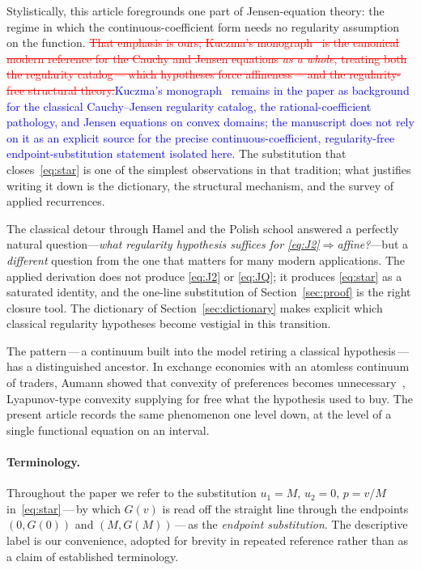 \documentclass{article}
\newcommand{\ReviewAdd}[1]{\textcolor{blue}{#1}}
\newcommand{\ReviewDel}[1]{\textcolor{red}{\sout{#1}}}
\theoremstyle{plain}
\theoremstyle{definition}
\begin{document}
Stylistically, this article foregrounds one part of Jensen-equation
theory: the regime in which the continuous-coefficient form needs no
regularity assumption on the function. \ReviewDel{That emphasis is ours; Kuczma's
monograph~\cite{Kuczma2009} is the canonical modern reference for the
Cauchy and Jensen equations \emph{as a whole}, treating both the
regularity catalog\,---\,which hypotheses force affineness\,---\,and the
regularity-free structural theory.}\ReviewAdd{Kuczma's monograph~\cite{Kuczma2009} remains in the paper as background for the classical Cauchy--Jensen regularity catalog, the rational-coefficient pathology, and Jensen equations on convex domains; the manuscript does not rely on it as an explicit source for the precise continuous-coefficient, regularity-free endpoint-substitution statement isolated here.}
The substitution that closes~\eqref{eq:star} is one of the simplest
observations in that tradition; what justifies writing it down is the
dictionary, the structural mechanism, and the survey of applied
recurrences.

The classical detour through Hamel and the Polish school answered a
perfectly natural question---\emph{what regularity hypothesis suffices
for \eqref{eq:J2}$\Rightarrow$affine?}---but a \emph{different}
question from the one that matters for many modern applications. The
applied derivation does not produce \eqref{eq:J2} or \eqref{eq:JQ};
it produces \eqref{eq:star} as a saturated identity, and the one-line
substitution of Section~\ref{sec:proof} is the right closure tool. The
dictionary of Section~\ref{sec:dictionary} makes explicit which classical
regularity hypotheses become vestigial in this transition.

The pattern\,---\,a continuum built into the model retiring a
classical hypothesis\,---\,has a distinguished ancestor. In exchange
economies with an atomless continuum of traders, Aumann showed that
convexity of preferences becomes unnecessary~\cite{Aumann1964},
Lyapunov-type convexity supplying for free what the hypothesis used to
buy. The present article records the same phenomenon one level down, at
the level of a single functional equation on an interval.

\paragraph{Terminology.}
Throughout the paper we refer to the substitution $u_1=M$, $u_2=0$,
$p=v/M$ in~\eqref{eq:star}\,---\,by which $G(v)$ is read off the straight
line through the endpoints $(0,G(0))$ and $(M,G(M))$\,---\,as the
\emph{endpoint substitution}. The descriptive
label is our convenience, adopted for brevity in repeated reference
rather than as a claim of established terminology.
\end{document}
